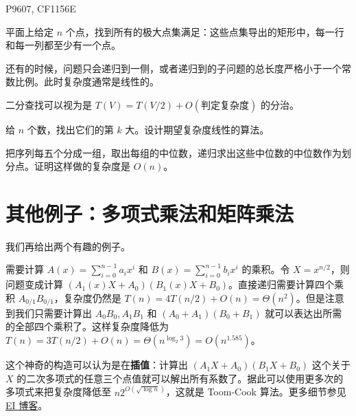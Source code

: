 \begin{exercise}
    P9607, CF1156E
\end{exercise}

\begin{example}[CF475F]
    平面上给定 $n$ 个点，找到所有的极大点集满足：这些点集导出的矩形中，每一行和每一列都至少有一个点。
\end{example}

还有的时候，问题只会递归到一侧，或者递归到的子问题的总长度严格小于一个常数比例。此时复杂度通常是线性的。

\begin{example}[二分查找]
    二分查找可以视为是 $T(V)=T(V/2)+O(\text{判定复杂度})$ 的分治。
\end{example}
\begin{example}[快速选择算法]
    给 $n$ 个数，找出它们的第 $k$ 大。设计期望复杂度线性的算法。
\end{example}
\begin{exercise}
    把序列每五个分成一组，取出每组的中位数，递归求出这些中位数的中位数作为划分点。证明这样做的复杂度是 $O(n)$。
\end{exercise}

\section{其他例子：多项式乘法和矩阵乘法}

我们再给出两个有趣的例子。

\begin{example}
    需要计算 $A(x)=\sum_{i=0}^{n-1} a_i x^i$ 和 $B(x)=\sum_{i=0}^{n-1} b_i x^i$ 的乘积。令 $X=x^{n/2}$，则问题变成计算 $(A_1(x)X+A_0)(B_1(x)X+B_0)$。直接递归需要计算四个乘积 $A_{0/1}B_{0/1}$，复杂度仍然是 $T(n)=4T(n/2)+O(n)=\Theta(n^2)$。但是注意到我们只需要计算出 $A_0B_0,A_1B_1$ 和 $(A_0+A_1)(B_0+B_1)$ 就可以表达出所需的全部四个乘积了。这样复杂度降低为 $T(n)=3T(n/2)+O(n)=\Theta(n^{\log_2 3})=O(n^{1.585})$。  
\end{example}
\begin{remark}
    这个神奇的构造可以认为是在\textbf{插值}：计算出 $(A_1X+A_0)(B_1X+B_0)$ 这个关于 $X$ 的二次多项式的任意三个点值就可以解出所有系数了。据此可以使用更多次的多项式来把复杂度降低至 $n2^{O(\sqrt{\log n})}$，这就是 Toom-Cook 算法。更多细节参见\href{https://www.cnblogs.com/Elegia/p/18020040/integer-multiplication}{EI 博客}。
\end{remark}

